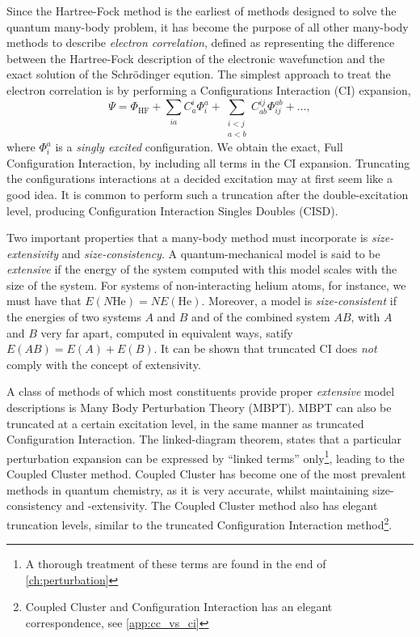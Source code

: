    Since the Hartree-Fock method is the earliest of methods designed to solve the quantum 
    many-body problem, it has become the purpose of all other many-body methods to describe 
    \emph{electron correlation}, defined as representing the difference between the 
    Hartree-Fock description of the electronic wavefunction and the exact solution of 
    the Schrödinger eqution. The simplest approach to treat the electron correlation
    is by performing a Configurations Interaction (CI) expansion,
    \begin{equation}
        \Psi = \Phi_\text{HF} 
            + \sum_{ia} C^i_a\Phi^a_i 
            + \sum_{\substack{i < j \\ a < b}} C^{ij}_{ab} \Phi^{ab}_{ij} + \dots,
    \end{equation}
    where $\Phi^a_i$ is a \emph{singly excited} configuration. We obtain the exact,
    Full Configuration Interaction, by including all terms in the CI expansion.
    Truncating the configurations interactions at a decided excitation may at first 
    seem like a good idea. It is common to perform such a truncation after the 
    double-excitation level, producing Configuration Interaction Singles Doubles (CISD).

    Two important properties that a many-body method must incorporate is \emph{size-extensivity}
    and \emph{size-consistency}. A quantum-mechanical model is said to be \emph{extensive}
    if the energy of the system computed with this model scales with the size of the 
    system\cite{bartlett1978many}. For systems of non-interacting helium atoms, for instance,
    we must have that $E(N\text{He}) = NE(\text{He})$. Moreover, a model is \emph{size-consistent}
    if the energies of two systems $A$ and $B$ and of the combined system $AB$, with 
    $A$ and $B$ very far apart, computed in equivalent ways, satify
    $E(AB) = E(A) + E(B)$\cite{pople1976theoretical}. It can be shown that 
    truncated CI does \emph{not} comply with the concept of
    extensivity\cite{shavitt2009many}.

    A class of methods of which most constituents provide proper \emph{extensive} model
    descriptions is Many Body Perturbation Theory (MBPT)\cite{brueckner1955approximate}.
    MBPT can also be truncated at a certain 
    excitation level, in the same manner as truncated Configuration Interaction. 
    The linked-diagram theorem\cite{goldstone1957derivation}, states that a 
    particular perturbation expansion can be expressed by ``linked terms''
    only\footnote{A thorough treatment of these terms are found in the end of
    \autoref{ch:perturbation}},
    leading to the Coupled Cluster method\cite{coester1958bound,coester1960short}.
    Coupled Cluster has become one of the most prevalent methods in quantum chemistry,
    as it is very accurate, whilst maintaining size-consistency and -extensivity.
    The Coupled Cluster method also has elegant truncation levels, similar to the 
    truncated Configuration Interaction method\footnote{Coupled Cluster and
    Configuration Interaction has an elegant correspondence,
    see \autoref{app:cc_vs_ci}}.

